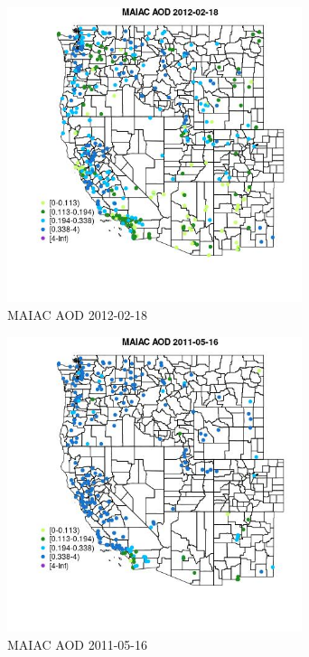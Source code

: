 \begin{figure} 
\centering  
\includegraphics[width=0.77\textwidth]{Code_Outputs/Report_ML_input_PM25_Step4_part_f_de_duplicated_aveswNAs_MapObsMAIAC_AOD2012-02-18.jpg} 
\caption{\label{fig:Report_ML_input_PM25_Step4_part_f_de_duplicated_aveswNAsMapObsMAIAC_AOD2012-02-18}MAIAC AOD 2012-02-18} 
\end{figure} 
 

\begin{figure} 
\centering  
\includegraphics[width=0.77\textwidth]{Code_Outputs/Report_ML_input_PM25_Step4_part_f_de_duplicated_aveswNAs_MapObsMAIAC_AOD2011-05-16.jpg} 
\caption{\label{fig:Report_ML_input_PM25_Step4_part_f_de_duplicated_aveswNAsMapObsMAIAC_AOD2011-05-16}MAIAC AOD 2011-05-16} 
\end{figure} 
 

